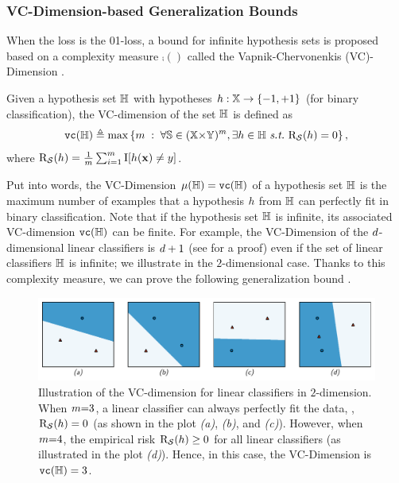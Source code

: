 \subsubsection{VC-Dimension-based Generalization Bounds}

When the loss is the 01-loss, a bound for infinite hypothesis sets is proposed based on a complexity measure $\comp()$ called the {\sc Vapnik}-{\sc Chervonenkis} (VC)-Dimension \citep{VapnikChervonenkis1968,VapnikChervonenkis1971}.

\begin{definition}\label{chap:intro:def:vc-dim} Given a hypothesis set $\mathbb{H}$ with hypotheses $h:\mathbb{X}\to\{-1, +1\}$ (for binary classification), the VC-dimension of the set $\mathbb{H}$ is defined as
\begin{align*}
    {\tt vc}(\mathbb{H}) \triangleq \max\left\{ m \;:\; \forall \mathbb{S}\in(\mathbb{X}{\times}\mathbb{Y})^m, \exists h\in\mathbb{H} \ \text{{\it s.t.}}\ \text{R}_{\mathcal{S}}(h) = 0 \right\},
\end{align*}
where $\text{R}_{\mathcal{S}}(h)=\frac{1}{m}\sum_{i=1}^{m}\operatorname{I}[h(\mathbf{x})\ne y]$.
\end{definition}
Put into words, the VC-Dimension $\operatorname{\mu}(\mathbb{H})={\tt vc}(\mathbb{H})$ of a hypothesis set $\mathbb{H}$ is the maximum number of examples that a hypothesis $h$ from $\mathbb{H}$ can perfectly fit in binary classification.
Note that if the hypothesis set $\mathbb{H}$ is infinite, its associated VC-dimension ${\tt vc}(\mathbb{H})$ can be finite.
For example, the VC-Dimension of the $d$-dimensional linear classifiers is $d+1$ (see \citet[Example~3.12]{MohriRostamizadehTalwalkar2012} for a proof) even if the set of linear classifiers $\mathbb{H}$ is infinite; we illustrate in  the $2$-dimensional case.
Thanks to this complexity measure, we can prove the following generalization bound \citep[Theorem~3.17, Corollaries 3.18 and 3.19]{MohriRostamizadehTalwalkar2012}.

\begin{figure}
    \centering
    \includegraphics[width=\textwidth]{chapter_1/figures/vc_dim.pdf}
    \caption[Illustration of the VC-dimension for Linear Classifiers in $2$-dimension]{
    Illustration of the VC-dimension for linear classifiers in $2$-dimension. 
    When $m{=}3$, a linear classifier can always perfectly fit the data, \ie, $\text{R}_{\mathcal{S}}(h)=0$ (as shown in the plot {\it (a)}, {\it (b)}, and {\it (c)}).
    However, when $m{=}4$, the empirical risk $\text{R}_{\mathcal{S}}(h)\ge 0$ for all linear classifiers (as illustrated in the plot {\it (d)}). 
    Hence, in this case, the VC-Dimension is ${\tt vc}(\mathbb{H})=3$.
    }
    \label{chap:intro:fig:vc_dim}
\end{figure}

